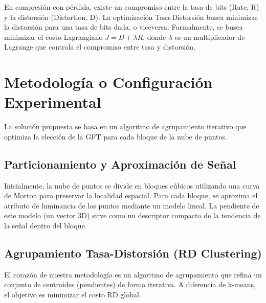 \begin{definition}
En compresión con pérdida, existe un compromiso entre la tasa de bits (Rate, R) y la distorsión (Distortion, D). La
optimización Tasa-Distorsión busca minimizar la distorsión para una tasa de bits dada, o viceversa. Formalmente, se
busca minimizar el costo Lagrangiano $J = D + \lambda R$, donde $\lambda$ es un multiplicador de Lagrange que controla
el compromiso entre tasa y distorsión\cite{ortega1998rate}.
\end{definition}

\section{Metodología o Configuración Experimental}
La solución propuesta se basa en un algoritmo de agrupamiento iterativo que optimiza la elección de la GFT para cada
bloque de la nube de puntos.

\subsection{Particionamiento y Aproximación de Señal}
Inicialmente, la nube de puntos se divide en bloques cúbicos utilizando una curva de Morton para preservar la
localidad espacial\cite{morton1966zorder}. Para cada bloque, se aproxima el atributo de luminancia de los puntos mediante un modelo lineal.
La pendiente de este modelo (un vector 3D) sirve como un descriptor compacto de la tendencia de la señal dentro del
bloque.

\subsection{Agrupamiento Tasa-Distorsión (RD Clustering)}
El corazón de nuestra metodología es un algoritmo de agrupamiento que refina un conjunto de centroides (pendientes) de
forma iterativa. A diferencia de k-means, el objetivo es minimizar el costo RD global.

